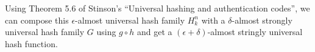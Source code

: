 \documentclass{letter}
\begin{document}
Using Theorem 5.6 of Stinson's ``Universal hashing and authentication codes'', we can compose this $\epsilon$-almost universal hash family $H^n_k$ with a $\delta$-almost strongly universal hash family $G$ using $g \circ h$ and get a $(\epsilon+\delta)$-almost stringly universal hash function.



\end{document}
